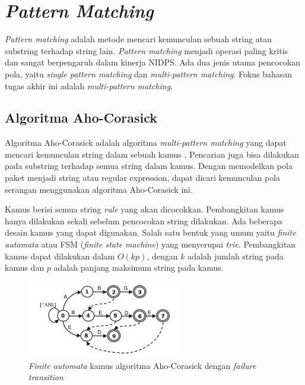 \section{\emph{Pattern Matching}}

  \emph{Pattern matching} adalah metode mencari kemunculan sebuah string atau substring terhadap string lain. \emph{Pattern matching} menjadi operasi paling kritis dan sangat berpengaruh dalam kinerja NIDPS. Ada dua jenis utama pencocokan pola, yaitu \emph{single pattern matching} dan \emph{multi-pattern matching}. Fokus bahasan tugas akhir ini adalah \emph{multi-pattern matching}.

  \subsection{Algoritma Aho-Corasick}

    Algoritma Aho-Corasick adalah algoritma \emph{multi-pattern matching} yang dapat mencari kemunculan string dalam sebuah kamus \parencite{ahoc1975}. Pencarian juga bisa dilakukan pada substring terhadap semua string dalam kamus. Dengan memodelkan pola paket menjadi string atau regular expression, dapat dicari kemunculan pola serangan menggunakan algoritma Aho-Corasick ini.

    Kamus berisi semua string \emph{rule} yang akan dicocokkan. Pembangkitan kamus hanya dilakukan sekali sebelum pencocokan string dilakukan. Ada beberapa desain kamus yang dapat digunakan. Salah satu bentuk yang umum yaitu \emph{finite automata} atau FSM (\emph{finite state machine}) yang menyerupai \emph{trie}. Pembangkitan kamus dapat dilakukan dalam $O(kp)$, dengan $k$ adalah jumlah string pada kamus dan $p$ adalah panjang maksimum string pada kamus.

    \begin{figure}[H]
      \centering
      \includegraphics[width=0.6\textwidth]{resources/aho-c.png}
      \caption[\emph{Finite automata} kamus algoritma Aho-Corasick dengan \emph{failure transition}]{\emph{Finite automata} kamus algoritma Aho-Corasick dengan \emph{failure transition} \parencite{lin2013}}
    \end{figure}

